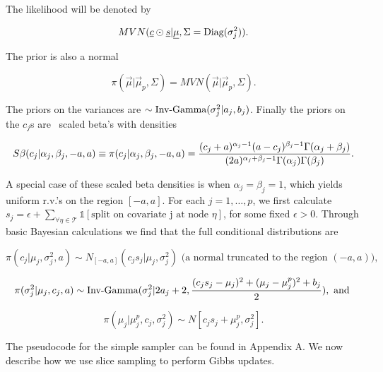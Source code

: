  The likelihood will be denoted by
 
 \begin{equation}\newnot{symbol:mvn}
 MVN(\vec{c}\odot\vec{s}\vert \vec{\mu}, \Sigma=\text{Diag}(\sigma^2_j)).
 \end{equation}
 
 The prior is also a normal 
 
 \begin{equation}
 \pi(\vec{\mu}\vert \vec{\mu}_p, \Sigma)=MVN(\vec{\mu}\vert \vec{\mu}_p, \Sigma).
 \end{equation}

The priors on the variances are \iid $\sim \text{Inv-Gamma}({\sigma_j^2}\vert{a_j},{b_j})$.
Finally the priors on the $c_j$s are \iid\ scaled beta's with densities 

\begin{equation}\newnot{symbol:scaled_beta}
S\beta(c_j\vert \alpha_j, \beta_j, -a, a)\equiv\pi(c_j\vert \alpha_j, \beta_j, -a, a)= \frac{(c_j+a)^{\alpha_j-1}(a-c_j)^{\beta_j-1}\Gamma(\alpha_j+\beta_j)}{(2a)^{\alpha_j+\beta_j-1}\Gamma(\alpha_j)\Gamma(\beta_j)}.
\end{equation}

A special case of these scaled beta densities is when $\alpha_j=\beta_j=1$, which yields uniform r.v.'s on the region  $[-a,a]$. 
For each $j=1, \dots, p$, we first calculate $s_j = \epsilon+\sum_{\forall \eta \in \mathcal{T}}\mathds{1}[\text{split on covariate j at node $\eta$}]$, for some fixed $\epsilon>0$.
Through basic Bayesian calculations we find that the full conditional distributions are 

\begin{equation}
\pi(c_j\vert \mu_j, \sigma_j^2, a) \sim N_{[-a,a]}(c_js_j\vert \mu_j, \sigma^2_j) \text{ (a normal truncated to the region $(-a,a)$),}
\end{equation}

\begin{equation}
\pi(\sigma^2_j \vert \mu_j, c_j, a) \sim \text{Inv-Gamma}({\sigma_j^2}\vert{2a_j+2},{\frac{(c_js_j-\mu_j)^2+ (\mu_j-\mu_j^p)^2+b_j}{2}}), \text{ and } 
\end{equation}

\begin{equation}
\pi(\mu_j\vert \mu_j^p, c_j, \sigma^2_j)\sim N[c_js_j+\mu_j^p, \sigma_j^2].
\end{equation}

The pseudocode for the simple sampler can be found in Appendix A. We now describe how we use slice sampling to perform Gibbs updates.

